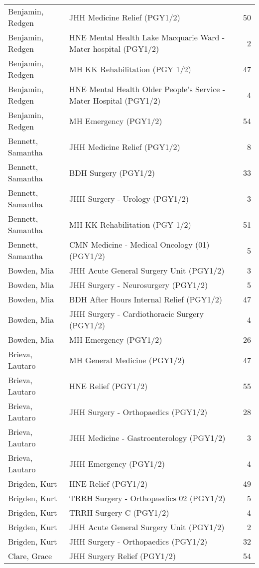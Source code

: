 \documentclass[
]{article}
\begin{document}
\begin{longtable}{llr}
Benjamin, Redgen & JHH Medicine Relief (PGY1/2) & 50 \\ 
Benjamin, Redgen & HNE Mental Health Lake Macquarie Ward - Mater hospital (PGY1/2) & 2 \\ 
Benjamin, Redgen & MH KK Rehabilitation (PGY 1/2) & 47 \\ 
Benjamin, Redgen & HNE Mental Health Older People's Service - Mater Hospital (PGY1/2) & 4 \\ 
Benjamin, Redgen & MH Emergency (PGY1/2) & 54 \\ 
Bennett, Samantha & JHH Medicine Relief (PGY1/2) & 8 \\ 
Bennett, Samantha & BDH Surgery (PGY1/2) & 33 \\ 
Bennett, Samantha & JHH Surgery - Urology (PGY1/2) & 3 \\ 
Bennett, Samantha & MH KK Rehabilitation (PGY 1/2) & 51 \\ 
Bennett, Samantha & CMN Medicine - Medical Oncology (01) (PGY1/2) & 5 \\ 
Bowden, Mia & JHH Acute General Surgery Unit (PGY1/2) & 3 \\ 
Bowden, Mia & JHH Surgery - Neurosurgery (PGY1/2) & 5 \\ 
Bowden, Mia & BDH After Hours Internal Relief (PGY1/2) & 47 \\ 
Bowden, Mia & JHH Surgery - Cardiothoracic Surgery (PGY1/2) & 4 \\ 
Bowden, Mia & MH Emergency (PGY1/2) & 26 \\ 
Brieva, Lautaro & MH General Medicine (PGY1/2) & 47 \\ 
Brieva, Lautaro & HNE Relief (PGY1/2) & 55 \\ 
Brieva, Lautaro & JHH Surgery - Orthopaedics (PGY1/2) & 28 \\ 
Brieva, Lautaro & JHH Medicine - Gastroenterology (PGY1/2) & 3 \\ 
Brieva, Lautaro & JHH Emergency (PGY1/2) & 4 \\ 
Brigden, Kurt & HNE Relief (PGY1/2) & 49 \\ 
Brigden, Kurt & TRRH Surgery - Orthopaedics 02 (PGY1/2) & 5 \\ 
Brigden, Kurt & TRRH Surgery C (PGY1/2) & 4 \\ 
Brigden, Kurt & JHH Acute General Surgery Unit (PGY1/2) & 2 \\ 
Brigden, Kurt & JHH Surgery - Orthopaedics (PGY1/2) & 32 \\ 
Clare, Grace & JHH Surgery Relief (PGY1/2) & 54 \\ 

\end{longtable}
\end{document}
